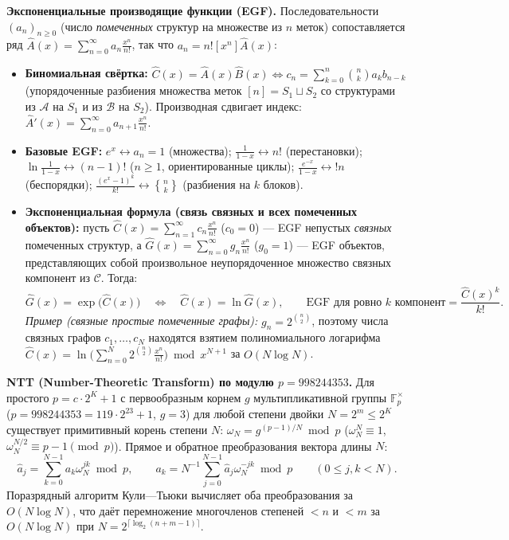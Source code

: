 \documentclass[10pt,a4paper]{article}
\renewcommand{\le}{\leqslant}
\renewcommand{\ge}{\geqslant}
\newcommand{\F}{\mathbb{F}}
\newcommand{\stirlingsecond}[2]{\genfrac{\{}{\}}{0pt}{}{#1}{#2}}
\begin{document}
\textbf{Экспоненциальные производящие функции (EGF).} Последовательности $(a_n)_{n \ge 0}$ (число \emph{помеченных} структур на множестве из $n$ меток) сопоставляется ряд $\widehat{A}(x) = \sum_{n=0}^\infty a_n \frac{x^n}{n!}$, так что $a_n = n! [x^n]\widehat{A}(x)$:
\begin{itemize}
  \item \textbf{Биномиальная свёртка:} $\widehat{C}(x) = \widehat{A}(x)\widehat{B}(x) \iff c_n = \sum_{k=0}^n \binom{n}{k} a_k b_{n - k}$ (упорядоченные разбиения множества меток $[n] = S_1 \sqcup S_2$ со структурами из $\mathcal{A}$ на $S_1$ и из $\mathcal{B}$ на $S_2$). Производная сдвигает индекс: $\widehat{A}'(x) = \sum_{n=0}^\infty a_{n+1}\frac{x^n}{n!}$.
  \item \textbf{Базовые EGF:} $e^x \leftrightarrow a_n = 1$ (множества); $\frac{1}{1 - x} \leftrightarrow n!$ (перестановки); $\ln\frac{1}{1 - x} \leftrightarrow (n - 1)!$ ($n \ge 1$, ориентированные циклы); $\frac{e^{-x}}{1 - x} \leftrightarrow !n$ (беспорядки); $\frac{(e^x - 1)^k}{k!} \leftrightarrow \stirlingsecond{n}{k}$ (разбиения на $k$ блоков).
  \item \textbf{Экспоненциальная формула (связь связных и всех помеченных объектов):} пусть $\widehat{C}(x) = \sum_{n=1}^\infty c_n \frac{x^n}{n!}$ ($c_0 = 0$) — EGF непустых \emph{связных} помеченных структур, а $\widehat{G}(x) = \sum_{n=0}^\infty g_n \frac{x^n}{n!}$ ($g_0 = 1$) — EGF объектов, представляющих собой произвольное неупорядоченное множество связных компонент из $\mathcal{C}$. Тогда:
  \[
    \widehat{G}(x) = \exp\!\bigl(\widehat{C}(x)\bigr) \quad \Longleftrightarrow \quad \widehat{C}(x) = \ln \widehat{G}(x), \qquad
    \text{EGF для ровно } k \text{ компонент} = \frac{\widehat{C}(x)^k}{k!}.
  \]
  \emph{Пример (связные простые помеченные графы):} $g_n = 2^{\binom{n}{2}}$, поэтому числа связных графов $c_1, \dots, c_N$ находятся взятием полиномиального логарифма $\widehat{C}(x) = \ln\!\bigl(\sum_{n=0}^N 2^{\binom{n}{2}} \frac{x^n}{n!}\bigr) \bmod x^{N+1}$ за $O(N \log N)$.
\end{itemize}

\textbf{NTT (Number-Theoretic Transform) по модулю $p = 998244353$.} Для простого $p = c \cdot 2^K + 1$ с первообразным корнем $g$ мультипликативной группы $\F_p^\times$ ($p = 998244353 = 119 \cdot 2^{23} + 1$, $g = 3$) для любой степени двойки $N = 2^m \le 2^K$ существует примитивный корень степени $N$: $\omega_N = g^{(p - 1)/N} \bmod p$ ($\omega_N^N \equiv 1$, $\omega_N^{N/2} \equiv p - 1 \pmod p$). Прямое и обратное преобразования вектора длины $N$:
\[
  \hat{a}_j = \sum_{k=0}^{N - 1} a_k \omega_N^{jk} \bmod p, \qquad
  a_k = N^{-1} \sum_{j=0}^{N - 1} \hat{a}_j \omega_N^{-jk} \bmod p \qquad (0 \le j, k < N).
\]
Поразрядный алгоритм Кули—Тьюки вычисляет оба преобразования за $O(N \log N)$, что даёт перемножение многочленов степеней $< n$ и $< m$ за $O(N \log N)$ при $N = 2^{\lceil \log_2(n + m - 1) \rceil}$.
\end{document}
